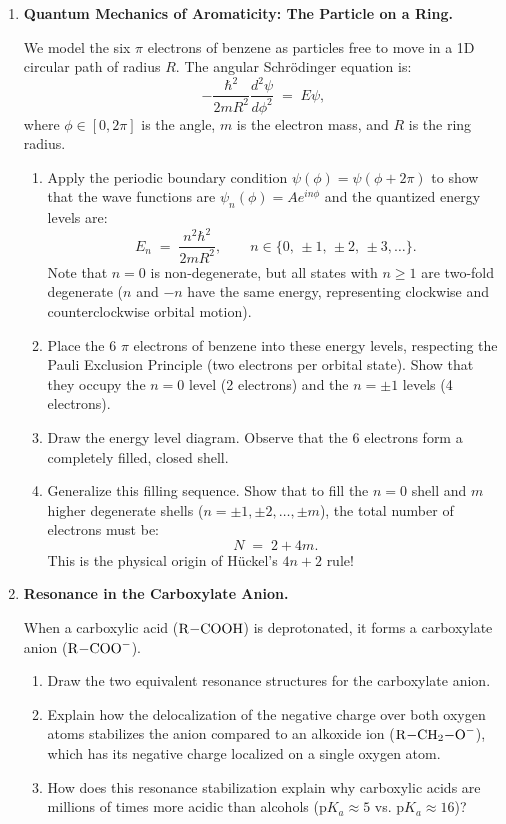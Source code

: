 \documentclass[12pt, a4paper]{book}
\begin{document}
\begin{deepbox}
\begin{enumerate}[label=\textbf{D\arabic*.}]
  \item \textbf{Quantum Mechanics of Aromaticity: The Particle on a Ring.}
  
        We model the six $\pi$ electrons of benzene as particles free to move in a 1D circular path of radius $R$.
        The angular Schrödinger equation is:
        \[
          -\frac{\hbar^2}{2m R^2} \frac{d^2 \psi}{d\phi^2} \;=\; E \psi,
        \]
        where $\phi \in [0, 2\pi]$ is the angle, $m$ is the electron mass, and $R$ is the ring radius.
        \begin{enumerate}[label=(\alph*)]
          \item Apply the periodic boundary condition $\psi(\phi) = \psi(\phi + 2\pi)$ to show that the wave functions are $\psi_n(\phi) = A e^{i n \phi}$ and the quantized energy levels are:
          \[
            E_n \;=\; \frac{n^2 \hbar^2}{2m R^2}, \qquad n \in \{0, \, \pm 1, \, \pm 2, \, \pm 3, \dots\}.
          \]
          Note that $n=0$ is non-degenerate, but all states with $n \ge 1$ are two-fold degenerate ($n$ and $-n$ have the same energy, representing clockwise and counterclockwise orbital motion).
          \item Place the 6 $\pi$ electrons of benzene into these energy levels, respecting the Pauli Exclusion Principle (two electrons per orbital state). Show that they occupy the $n=0$ level (2 electrons) and the $n=\pm 1$ levels (4 electrons).
          \item Draw the energy level diagram. Observe that the 6 electrons form a completely filled, closed shell.
          \item Generalize this filling sequence. Show that to fill the $n=0$ shell and $m$ higher degenerate shells ($n = \pm 1, \pm 2, \dots, \pm m$), the total number of electrons must be:
          \[
            N \;=\; 2 + 4m.
          \]
          This is the physical origin of Hückel's $4n+2$ rule!
        \end{enumerate}

  \item \textbf{Resonance in the Carboxylate Anion.}
  
        When a carboxylic acid ($\ce{R-COOH}$) is deprotonated, it forms a carboxylate anion ($\ce{R-COO-}$).
        \begin{enumerate}[label=(\alph*)]
          \item Draw the two equivalent resonance structures for the carboxylate anion.
          \item Explain how the delocalization of the negative charge over both oxygen atoms stabilizes the anion compared to an alkoxide ion ($\ce{R-CH2-O-}$), which has its negative charge localized on a single oxygen atom.
          \item How does this resonance stabilization explain why carboxylic acids are millions of times more acidic than alcohols ($\text{p}K_a \approx 5$ vs. $\text{p}K_a \approx 16$)?
        \end{enumerate}
\end{enumerate}
\end{deepbox}
\end{document}
